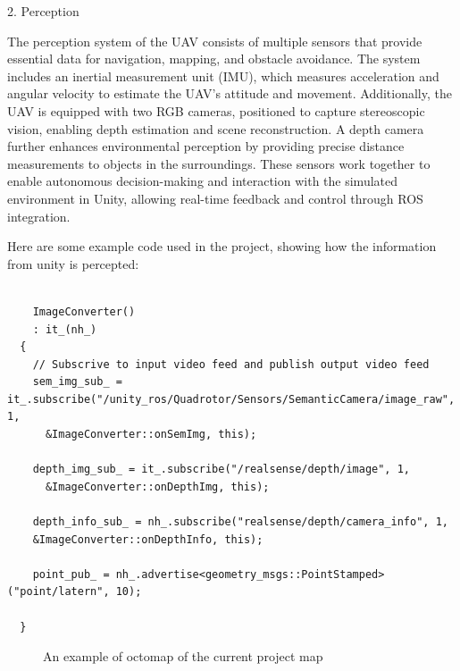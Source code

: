 \documentclass{article}
\begin{document}
2. Perception

The perception system of the UAV consists of multiple sensors that provide essential data for navigation, mapping, and obstacle avoidance. The system includes an inertial measurement unit (IMU), which measures acceleration and angular velocity to estimate the UAV's attitude and movement. Additionally, the UAV is equipped with two RGB cameras, positioned to capture stereoscopic vision, enabling depth estimation and scene reconstruction. A depth camera further enhances environmental perception by providing precise distance measurements to objects in the surroundings. These sensors work together to enable autonomous decision-making and interaction with the simulated environment in Unity, allowing real-time feedback and control through ROS integration.

Here are some example code used in the project, showing how the information from unity is percepted:
\begin{lstlisting}

    ImageConverter()
    : it_(nh_)
  {
    // Subscrive to input video feed and publish output video feed
    sem_img_sub_ = it_.subscribe("/unity_ros/Quadrotor/Sensors/SemanticCamera/image_raw", 1,
      &ImageConverter::onSemImg, this);

    depth_img_sub_ = it_.subscribe("/realsense/depth/image", 1,
      &ImageConverter::onDepthImg, this);  

    depth_info_sub_ = nh_.subscribe("realsense/depth/camera_info", 1, 
    &ImageConverter::onDepthInfo, this);

    point_pub_ = nh_.advertise<geometry_msgs::PointStamped>("point/latern", 10);

  }
\end{lstlisting}
\begin{figure}[h]
\centering
    \caption{An example of octomap of the current project map}
    \label{fig:GUI}
\end{figure}
\end{document}

